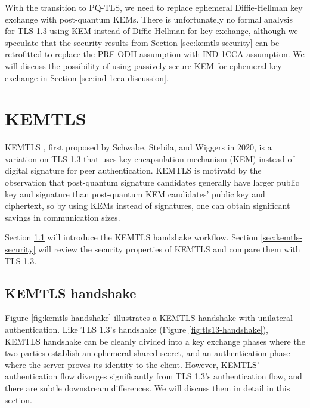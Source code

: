 \documentclass[letterpaper,12pt,titlepage,oneside,final]{book}
\begin{document}
With the transition to PQ-TLS, we need to replace ephemeral Diffie-Hellman key exchange with post-quantum KEMs.
There is unfortunately no formal analysis for TLS 1.3 using KEM instead of Diffie-Hellman for key exchange, although we speculate that the security results from Section \ref{sec:kemtls-security} can be retrofitted to replace the PRF-ODH assumption with IND-1CCA assumption.
We will discuss the possibility of using passively secure KEM for ephemeral key exchange in Section \ref{sec:ind-1cca-discussion}.

\section{KEMTLS}\label{sec:kemtls}
KEMTLS \cite{DBLP:conf/ccs/SchwabeSW20,DBLP:conf/acns/GuntherRTW22,DBLP:conf/esorics/SchwabeSW21}, first proposed by Schwabe, Stebila, and Wiggers in 2020, is a variation on TLS 1.3 that uses key encapsulation mechanism (KEM) instead of digital signature for peer authentication.
KEMTLS is motivatd by the observation that post-quantum signature candidates generally have larger public key and signature than post-quantum KEM candidates' public key and ciphertext, so by using KEMs instead of signatures, one can obtain significant savings in communication sizes.

Section \ref{sec:kemtls-handshake} will introduce the KEMTLS handshake workflow. Section \ref{sec:kemtls-security} will review the security properties of KEMTLS and compare them with TLS 1.3.

\subsection{KEMTLS handshake}\label{sec:kemtls-handshake}
Figure \ref{fig:kemtls-handshake} illustrates a KEMTLS handshake with unilateral authentication. Like TLS 1.3's handshake (Figure \ref{fig:tls13-handshake}), KEMTLS handshake can be cleanly divided into a key exchange phases where the two parties establish an ephemeral shared secret, and an authentication phase where the server proves its identity to the client. However, KEMTLS' authentication flow diverges significantly from TLS 1.3's authentication flow, and there are subtle downstream differences. We will discuss them in detail in this section.
\end{document}
